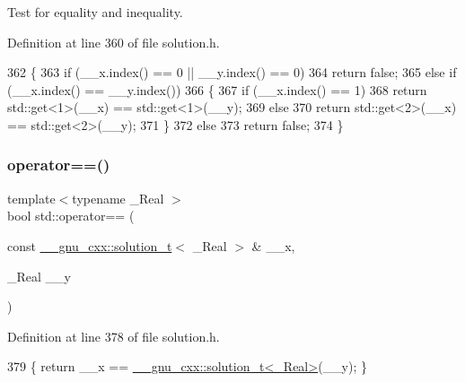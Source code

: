 Test for equality and inequality. 

Definition at line 360 of file solution.\+h.


\begin{DoxyCode}
362     \{
363       \textcolor{keywordflow}{if} (\_\_x.index() == 0 || \_\_y.index() == 0)
364         \textcolor{keywordflow}{return} \textcolor{keyword}{false};
365       \textcolor{keywordflow}{else} \textcolor{keywordflow}{if} (\_\_x.index() == \_\_y.index())
366         \{
367           \textcolor{keywordflow}{if} (\_\_x.index() == 1)
368             \textcolor{keywordflow}{return} std::get<1>(\_\_x) == std::get<1>(\_\_y);
369           \textcolor{keywordflow}{else}
370             \textcolor{keywordflow}{return} std::get<2>(\_\_x) == std::get<2>(\_\_y);
371         \}
372       \textcolor{keywordflow}{else}
373         \textcolor{keywordflow}{return} \textcolor{keyword}{false};
374     \}
\end{DoxyCode}
\mbox{\label{namespacestd_a08af35ce00cff32a8b0a06b87d63f158}} 
\subsubsection{\texorpdfstring{operator==()}{operator==()}\hspace{0.1cm}{\footnotesize\ttfamily [2/5]}}
{\footnotesize\ttfamily template$<$typename \+\_\+\+Real $>$ \\
bool std\+::operator== (\begin{DoxyParamCaption}\item[{const \hyperlink{namespace____gnu__cxx_ae20ea642de50eb361074c62676b0159c}{\+\_\+\+\_\+gnu\+\_\+cxx\+::solution\+\_\+t}$<$ \+\_\+\+Real $>$ \&}]{\+\_\+\+\_\+x,  }\item[{\+\_\+\+Real}]{\+\_\+\+\_\+y }\end{DoxyParamCaption})}



Definition at line 378 of file solution.\+h.


\begin{DoxyCode}
379     \{ \textcolor{keywordflow}{return} \_\_x == \hyperlink{namespace____gnu__cxx_ae20ea642de50eb361074c62676b0159c}{\_\_gnu\_cxx::solution\_t<\_Real>}(\_\_y); \}
\end{DoxyCode}
\mbox{\label{namespacestd_ae5dda4ad56d172c7d64f58b465e3c5c2}} 
